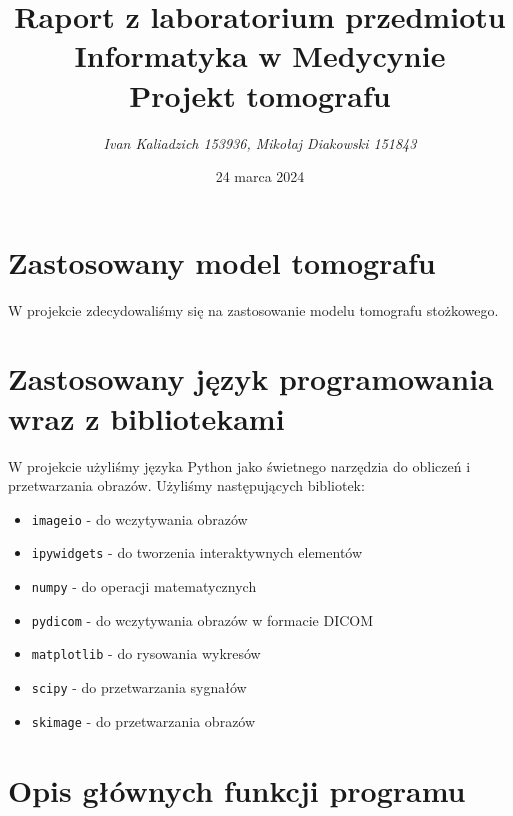 \documentclass[11pt,a4paper]{article}
\title{Raport z laboratorium przedmiotu\\Informatyka w Medycynie\\Projekt tomografu}
\author{\emph{Ivan Kaliadzich 153936, Mikołaj Diakowski 151843}}
\date{24 marca 2024}
\begin{document}
\maketitle
    \section{Zastosowany model tomografu}
    W projekcie zdecydowaliśmy się na zastosowanie modelu tomografu stożkowego.
    \section{Zastosowany język programowania wraz z bibliotekami}
    W projekcie użyliśmy języka Python jako świetnego narzędzia do obliczeń i przetwarzania obrazów. Użyliśmy
    następujących bibliotek:
    \begin{itemize}
        \item \texttt{imageio} - do wczytywania obrazów
        \item \texttt{ipywidgets} - do tworzenia interaktywnych elementów
        \item \texttt{numpy} - do operacji matematycznych
        \item \texttt{pydicom} - do wczytywania obrazów w formacie DICOM
        \item \texttt{matplotlib} - do rysowania wykresów
        \item \texttt{scipy} - do przetwarzania sygnałów
        \item \texttt{skimage} - do przetwarzania obrazów
        \end{itemize}
    \section{Opis głównych funkcji programu}
\end{document}
